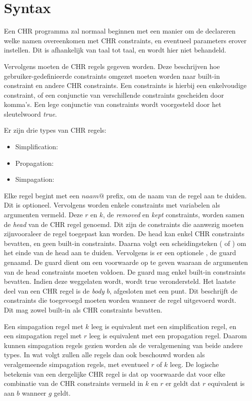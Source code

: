 \section{Syntax} \label{sec:chr-syntax}

Een CHR programma zal normaal beginnen met een manier om de declareren welke namen overeenkomen met CHR constraints, en eventueel parameters erover instellen. Dit is afhankelijk van taal tot taal, en wordt hier niet behandeld.

Vervolgens moeten de CHR regels gegeven worden. Deze beschrijven hoe gebruiker-gedefinieerde constraints omgezet moeten worden naar built-in constraint en andere CHR constraints. Een constraints is hierbij een enkelvoudige constraint, of een conjunctie van verschillende constraints gescheiden door komma's. Een lege conjunctie van constraints wordt voorgesteld door het sleutelwoord {\em true}. 

Er zijn drie types van CHR regels: \begin{itemize}
\item Simplification: 
\item Propagation: 
\item Simpagation: 
\end{itemize}
Elke regel begint met een $ naam @ $ prefix, om de naam van de regel aan te duiden. Dit is optioneel. Vervolgens worden enkele constraints met variabelen als argumenten vermeld. Deze $r$ en $k$, de {\em removed} en {\em kept} constraints, worden samen de {\em head} van de CHR regel genoemd. Dit zijn de constraints die aanwezig moeten zijnvooraleer de regel toegepast kan worden. De head kan enkel CHR constraints bevatten, en geen built-in constraints. Daarna volgt een scheidingsteken (\code{<=>} of \code{==>}) om het einde van de head aan te duiden. Vervolgens is er een optionele , de guard genaamd. De guard dient om een voorwaarde op te geven waaraan de argumenten van de head constraints moeten voldoen. De guard mag enkel built-in constraints bevatten. Indien deze weggelaten wordt, wordt true verondersteld. Het laatste deel van een CHR regel is de {\em body} $b$, afgesloten met een punt. Dit beschrijft de constraints die toegevoegd moeten worden wanneer de regel uitgevoerd wordt. Dit mag zowel built-in als CHR constraints bevatten.

Een simpagation regel met $k$ leeg is equivalent met een simplification regel, en een simpagation regel met $r$ leeg is equivalent met een propagation regel. Daarom kunnen simpagation regels gezien worden als de veralgemening van beide andere types. In wat volgt zullen alle regels dan ook beschouwd worden als veralgemeende simpagation regels, met eventueel $r$ of $k$ leeg. De logische betekenis van een dergelijke CHR regel is dat op voorwaarde dat voor elke combinatie van de CHR constraints vermeld in $k$ en $r$ er geldt dat $r$ equivalent is aan $b$ wanneer $g$ geldt.

